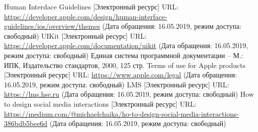\documentclass[a4paper,12pt,reqno]{article}
\begin{document}
	 \label{addition: D}
	
	\newpage
	\begin{thebibliography}{6}
		 Human Interdace Guidelines [Электронный ресурс] URL: \url{https://developer.apple.com/design/human-interface-guidelines/ios/overview/themes} (Дата обращения: 16.05.2019, режим доступа: свободный)
		 UIKit [Электронный ресурс] URL: \url{https://developer.apple.com/documentation/uikit} (Дата обращения: 16.05.2019, режим доступа: свободный)
		Единая система программной документации – М.: ИПК, Издательство стандартов, 2000, 125 стр.
		 Terms of use for Apple products [Электронный ресурс] URL: \url{https://www.apple.com/legal} (Дата обращения: 16.05.2019, режим доступа: свободный)
		LMS [Электронный ресурс] URL: 
		\url{https://lms.hse.ru} (Дата обращения: 16.05.2019, режим доступа: свободный)
		How to design social media interactions 
		[Электронный ресурс] URL:
		\url{https://medium.com/@michaelchaika/ho-to-design-social-media-interactions-386bdb5bee6d} (Дата обращения: 16.05.2019, режим доступа: свободный)
	\end{thebibliography}

						\newpage
	\listRegistration
\end{document}

